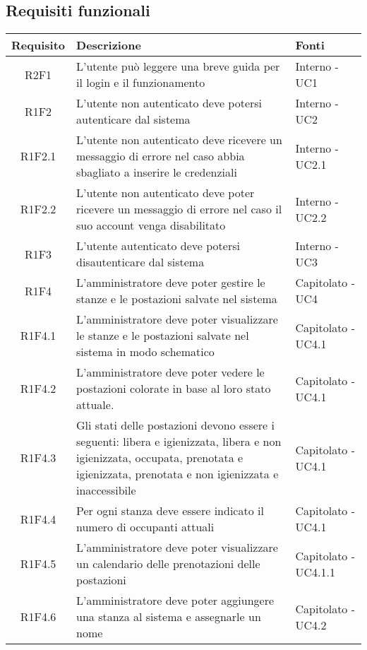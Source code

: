 \subsection{Requisiti funzionali}
\begin{center}
	\begin{longtable}{|c|p{10cm}|p{4cm}|}
		\hline
		\rowcolor{lighter-grayer}
		\textbf{Requisito} & \textbf{Descrizione} & \textbf{Fonti}  \\
		\hline
		\endfirsthead
		
		 R2F1 & L'utente può leggere una breve guida per il login e il funzionamento & Interno - UC1 \\
		\hline
		R1F2	&	L'utente non autenticato deve potersi autenticare dal sistema& Interno - UC2	\\
		\hline
		R1F2.1	&	L'utente non autenticato deve ricevere un messaggio di errore nel caso abbia sbagliato a inserire le credenziali& Interno - UC2.1	\\
		\hline
		R1F2.2	&	L'utente non autenticato deve poter ricevere un messaggio di errore nel caso il suo account venga disabilitato& Interno - UC2.2	\\
		\hline
		R1F3	&	L'utente autenticato deve potersi disautenticare dal sistema& Interno - UC3	\\
		\hline
			R1F4&L'amministratore deve poter gestire le stanze e le postazioni salvate nel sistema	& Capitolato - UC4	\\
					\hline
			R1F4.1&L'amministratore deve poter visualizzare le stanze e le postazioni salvate nel sistema in modo schematico	& Capitolato - UC4.1	\\
					\hline
			R1F4.2&	L'amministratore deve poter vedere le postazioni colorate in base al loro stato attuale.& Capitolato - UC4.1	\\
					\hline
			R1F4.3&	Gli stati delle postazioni devono essere i seguenti: libera e igienizzata, libera e non igienizzata, occupata, prenotata e igienizzata, prenotata e non igienizzata e inaccessibile& 	Capitolato - UC4.1\\
					\hline
			R1F4.4&Per ogni stanza deve essere indicato il numero di occupanti attuali	& Capitolato - UC4.1	\\
					\hline
			R1F4.5&L'amministratore deve poter visualizzare un calendario delle prenotazioni delle postazioni	& Capitolato - UC4.1.1	\\
					\hline
				R1F4.6&L'amministratore deve poter aggiungere una stanza al sistema e assegnarle un nome	& Capitolato - UC4.2	\\

\end{longtable}
\end{center}
